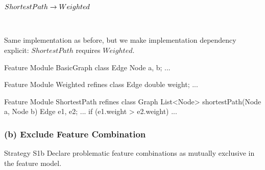 \begin{frame}[fragile]{\myframetitle}
	\begin{fancycolumns}[animation=none]
		\centering

		$ShortestPath \rightarrow Weighted$

		~
		\begin{note}{}
			Same implementation as before, but we make implementation dependency explicit: $ShortestPath$ requires $Weighted$.
		\end{note}
	\nextcolumn
\begin{codetight}{Feature Module BasicGraph}
class Edge {
	Node a, b; ...
}
\end{codetight}	
\begin{codetight}{Feature Module Weighted}
refines class Edge {
	double weight; ...
}
\end{codetight}	
\begin{codetight}{Feature Module ShortestPath}
refines class Graph {
	List<Node> shortestPath(Node a, Node b){
		Edge e1, e2;
		...
		if (e1.weight > e2.weight)
		... 
	}
}
\end{codetight}	
	\end{fancycolumns}
\end{frame}

\subsubsection*{(b) Exclude Feature Combination}
\begin{frame}{\myframetitle}
	\begin{fancycolumns}[widths={30},animation=none]
		\begin{definition}{Strategy S1b}
			Declare problematic feature combinations as mutually exclusive in the feature model.
		\end{definition}
	\nextcolumn
	\end{fancycolumns}
\end{frame}

